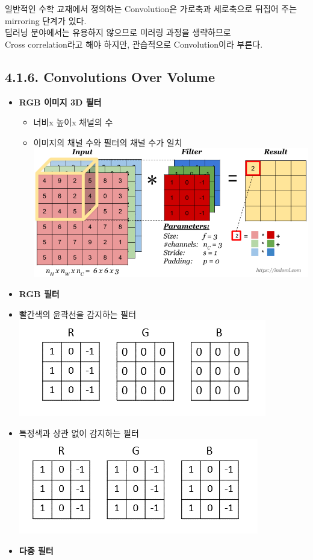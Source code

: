 \documentclass[11pt]{article}
\makeatletter
\def\maxwidth{\ifdim\Gin@nat@width>\linewidth\linewidth
    \else\Gin@nat@width\fi}
\let\Oldincludegraphics\includegraphics
\renewcommand{\includegraphics}[1]{\Oldincludegraphics[width=.8\maxwidth]{#1}}
\providecommand{\tightlist}{%
      \setlength{\itemsep}{0pt}\setlength{\parskip}{0pt}}
\makeatother
\begin{document}
일반적인 수학 교재에서 정의하는 Convolution은 가로축과 세로축으로 뒤집어
주는 mirroring 단계가 있다.\\
딥러닝 분야에서는 유용하지 않으므로 미러링 과정을 생략하므로\\
Cross correlation라고 해야 하지만, 관습적으로 Convolution이라 부른다. 

    \subsection{4.1.6. Convolutions Over
Volume}\label{convolutions-over-volume}

\begin{itemize}
\item
  \textbf{RGB 이미지 3D 필터}

  \begin{itemize}
  \tightlist
  \item
    너비x 높이x 채널의 수
  \item
    이미지의 채널 수와 필터의 채널 수가 일치\\
    \includegraphics{./Images/c4week1/10-2.png} 
  \end{itemize}
\item
  \textbf{RGB 필터}
\item
  빨간색의 윤곽선을 감지하는 필터\\
  \includegraphics{./Images/c4week1/12.png}\\
\item
  특정색과 상관 없이 감지하는 필터\\
  \includegraphics{./Images/c4week1/12-2.png}\\
\item
  \textbf{다중 필터}


\end{itemize}
\end{document}
